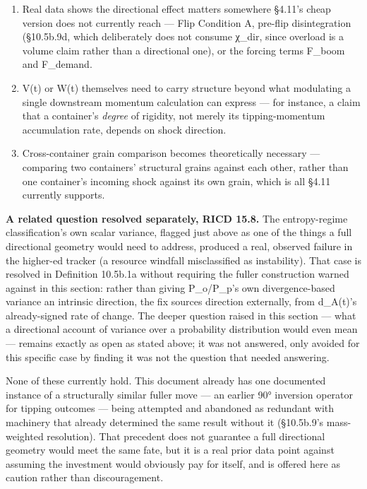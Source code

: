 \documentclass[
]{article}
\begin{document}
\begin{enumerate}
\def\labelenumi{\arabic{enumi}.}
\item
  Real data shows the directional effect matters somewhere §4.11's cheap
  version does not currently reach --- Flip Condition A, pre-flip
  disintegration (§10.5b.9d, which deliberately does not consume χ\_dir,
  since overload is a volume claim rather than a directional one), or
  the forcing terms F\_boom and F\_demand.
\item
  V(t) or W(t) themselves need to carry structure beyond what modulating
  a single downstream momentum calculation can express --- for instance,
  a claim that a container's \emph{degree} of rigidity, not merely its
  tipping-momentum accumulation rate, depends on shock direction.
\item
  Cross-container grain comparison becomes theoretically necessary ---
  comparing two containers' structural grains against each other, rather
  than one container's incoming shock against its own grain, which is
  all §4.11 currently supports.
\end{enumerate}

\textbf{A related question resolved separately, RICD 15.8.} The entropy-regime classification's own scalar variance, flagged just above as one of the things a full directional geometry would need to address, produced a real, observed failure in the higher-ed tracker (a resource windfall misclassified as instability). That case is resolved in Definition 10.5b.1a without requiring the fuller construction warned against in this section: rather than giving P\_o/P\_p's own divergence-based variance an intrinsic direction, the fix sources direction externally, from d\_A(t)'s already-signed rate of change. The deeper question raised in this section --- what a directional account of variance over a probability distribution would even mean --- remains exactly as open as stated above; it was not answered, only avoided for this specific case by finding it was not the question that needed answering.

None of these currently hold. This document already has one documented
instance of a structurally similar fuller move --- an earlier 90°
inversion operator for tipping outcomes --- being attempted and
abandoned as redundant with machinery that already determined the same
result without it (§10.5b.9's mass-weighted resolution). That precedent
does not guarantee a full directional geometry would meet the same fate,
but it is a real prior data point against assuming the investment would
obviously pay for itself, and is offered here as caution rather than
discouragement.
\end{document}
